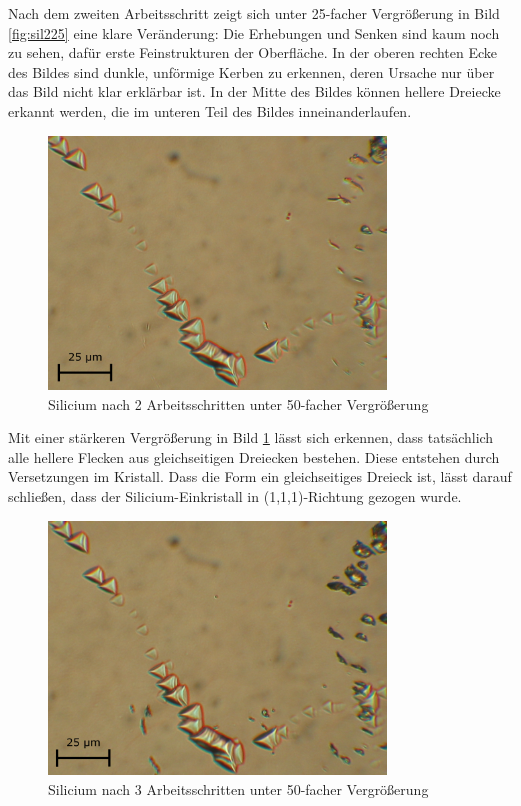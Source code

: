 \documentclass[german, %
parskip=full, %
bibliography=totoc, %
]{scrartcl}
\begin{document}
Nach dem zweiten Arbeitsschritt zeigt sich unter 25-facher Vergrößerung in Bild \ref{fig:sil225} eine klare Veränderung: Die Erhebungen und Senken sind kaum noch zu sehen, dafür erste Feinstrukturen der Oberfläche. In der oberen rechten Ecke des Bildes sind dunkle, unförmige Kerben zu erkennen, deren Ursache nur über das Bild nicht klar erklärbar ist. In der Mitte des Bildes können hellere Dreiecke erkannt werden, die im unteren Teil des Bildes inneinanderlaufen. 

\begin{figure}[ht] 
  \centering
     \includegraphics[width=0.8\textwidth]{Silicium_2_50}
  \caption{Silicium nach 2 Arbeitsschritten unter 50-facher Vergrößerung}
  \label{fig:sil250}
\end{figure}

Mit einer stärkeren Vergrößerung in Bild \ref{fig:sil250} lässt sich erkennen, dass tatsächlich alle hellere Flecken aus gleichseitigen Dreiecken bestehen. Diese entstehen durch Versetzungen im Kristall. Dass die Form ein gleichseitiges Dreieck ist, lässt darauf schließen, dass der Silicium-Einkristall in (1,1,1)-Richtung gezogen wurde.

\begin{figure}[ht] 
  \centering
     \includegraphics[width=0.8\textwidth]{Silicium_3_50}
  \caption{Silicium nach 3 Arbeitsschritten unter 50-facher Vergrößerung}
  \label{fig:sil350}
\end{figure}
\end{document}
